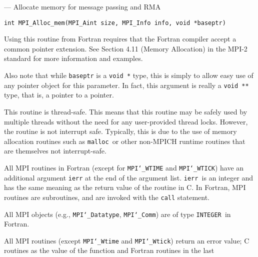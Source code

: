 \startmanpage
{}
--- Allocate memory for message passing and RMA 
\startvb\begin{verbatim}
int MPI_Alloc_mem(MPI_Aint size, MPI_Info info, void *baseptr)

\end{verbatim}
\endvb

\par
{}
\par
{}
Using this routine from Fortran requires that the Fortran compiler accept
a common pointer extension.  See Section 4.11 (Memory Allocation) in the
MPI-2 standard for more information and examples.
\par
Also note that while {\tt baseptr} is a {\tt void *} type, this is
simply to allow easy use of any pointer object for this parameter.
In fact, this argument is really a {\tt void **} type, that is, a
pointer to a pointer.
\par
{}
\par
This routine is thread-safe.  This means that this routine may be
safely used by multiple threads without the need for any user-provided
thread locks.  However, the routine is not interrupt safe.  Typically,
this is due to the use of memory allocation routines such as {\tt malloc
}or other non-MPICH runtime routines that are themselves not interrupt-safe.
\par
{}
All MPI routines in Fortran (except for {\tt MPI{\tt \char`\_}WTIME} and {\tt MPI{\tt \char`\_}WTICK}) have
an additional argument {\tt ierr} at the end of the argument list.  {\tt ierr
}is an integer and has the same meaning as the return value of the routine
in C.  In Fortran, MPI routines are subroutines, and are invoked with the
{\tt call} statement.
\par
All MPI objects (e.g., {\tt MPI{\tt \char`\_}Datatype}, {\tt MPI{\tt \char`\_}Comm}) are of type {\tt INTEGER
}in Fortran.
\par
{}
\par
All MPI routines (except {\tt MPI{\tt \char`\_}Wtime} and {\tt MPI{\tt \char`\_}Wtick}) return an error value;
C routines as the value of the function and Fortran routines in the last
